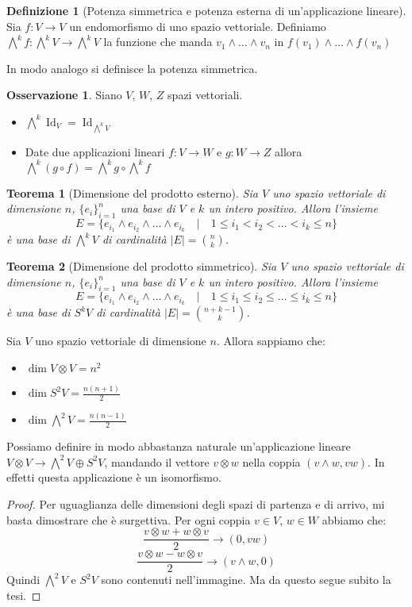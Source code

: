 \documentclass[11pt]{article}
\theoremstyle{plain}
\newtheorem{thm}{Teorema}[section]
\theoremstyle{definition}
\newtheorem{defn}{Definizione}[section]
\newtheorem*{rem}{Osservazione}
\theoremstyle{remark}
\DeclareMathOperator{\Id}{Id}
\begin{document}
\begin{defn}[Potenza simmetrica e potenza esterna di un'applicazione lineare]
Sia $f: V\to V$ un endomorfismo di uno spazio vettoriale. Definiamo 
$\bigwedge^k f : \bigwedge^k V \to \bigwedge^k V$ la funzione che manda $v_1 \wedge \ldots \wedge v_n$ in $f(v_1) \wedge \ldots \wedge f(v_n)$

In modo analogo si definisce la potenza simmetrica.
\end{defn}


\begin{rem} Siano $V$, $W$, $Z$ spazi vettoriali.
\begin{itemize}
   \item $\bigwedge^k \Id_V = \Id_{\bigwedge^kV}$
   \item Date due applicazioni lineari $f:V\to W$ e $g:W\to Z$ allora $\bigwedge^k(g\circ f) = \bigwedge^kg\circ\bigwedge^kf$
\end{itemize}
\end{rem}

\begin{thm}[Dimensione del prodotto esterno]
Sia $V$ uno spazio vettoriale di dimensione $n$, $\{e_i\}_{i=1}^n$ una base di $V$ e $k$ un intero positivo.
Allora l'insieme
\[E=\{e_{i_1} \wedge e_{i_2}\wedge \ldots \wedge e_{i_k} \quad|\quad 1 \leq i_1 < i_2 <\ldots< i_k \leq n\}\]
è una base di $\bigwedge^k V$ di cardinalità $|E|= \binom {n}{k}$.
\label{thm:prodotto esterno}
\end{thm}


\begin{thm}[Dimensione del prodotto simmetrico]
Sia $V$ uno spazio vettoriale di dimensione $n$, $\{e_i\}_{i=1}^n$ una base di $V$ e $k$ un intero positivo.
Allora l'insieme 
\[E=\{e_{i_1} \wedge e_{i_2}\wedge\ldots \wedge e_{i_k} \quad|\quad 1 \leq i_1 \leq i_2 \leq\ldots\leq i_k \leq n\}\]
è una base di $S^k V$ di cardinalità $|E|= \binom {n+k-1}{k}$.
\label{thm:prodotto simmetrico}
\end{thm}

Sia $V$ uno spazio vettoriale di dimensione $n$. Allora sappiamo che:
\begin{itemize}
\item $\dim V\otimes V = n^2$
\item $\dim S^2V = \frac{n(n+1)}{2}$
\item $\dim \bigwedge^2V = \frac{n(n-1)}{2}$
\end{itemize}
Possiamo definire in modo abbastanza naturale un'applicazione lineare $V\otimes V\to \bigwedge^2V\oplus S^2V$,
mandando il vettore $v\otimes w$ nella coppia $(v\wedge w, vw)$. In effetti questa applicazione è un isomorfismo.
\begin{proof}
Per uguaglianza delle dimensioni degli spazi di partenza e di arrivo, mi basta dimostrare che è surgettiva.
Per ogni coppia $v\in V$, $w\in W$ abbiamo che:
\[\frac{v\otimes w + w\otimes v}{2} \to (0, vw)\]
\[\frac{v\otimes w - w\otimes v}{2} \to (v\wedge w, 0)\]
Quindi $\bigwedge^2V$ e $S^2V$ sono contenuti nell'immagine. Ma da questo segue subito la tesi.
\end{proof}
\end{document}

